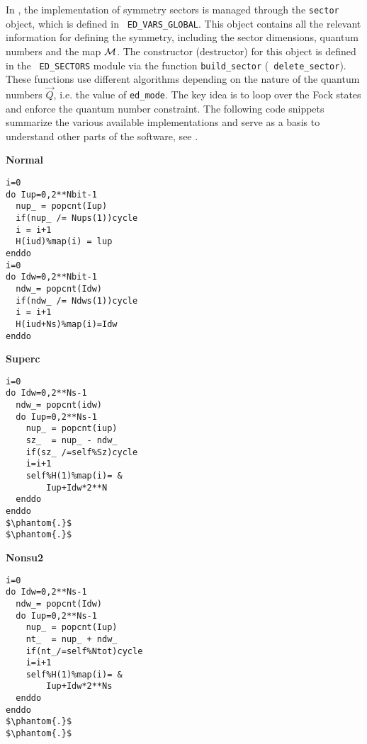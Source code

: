 \documentclass[edipack_sp.tex]{subfiles}
\begin{document}
In \NAME, the implementation of symmetry sectors is managed through the
{\tt sector} object, which is defined in {\tt
  ED\_VARS\_GLOBAL}. This object contains all the relevant
information for defining the symmetry, including the sector
dimensions, quantum numbers and the map ${\cal M}$. The constructor
(destructor) for this object is defined in the {\tt
  ED\_SECTORS} module via the function {\tt build\_sector} ({\tt
  delete\_sector}).
These functions use different algorithms depending on the nature 
of the quantum numbers $\vec{Q}$, i.e. the value of {\tt ed\_mode}. The key idea is to loop over the Fock states and enforce the quantum number constraint.
The following code snippets summarize the various available implementations and serve as a basis to understand other parts of the software, see .  
\begin{center}
\begin{minipage}[t]{0.32\linewidth}
\textbf{Normal}
\begin{lstlisting}[style=fstyle,frame=leftline,numbers=none,basicstyle={\ttfamily\scriptsize}]
i=0
do Iup=0,2**Nbit-1     
  nup_ = popcnt(Iup) 
  if(nup_ /= Nups(1))cycle
  i = i+1
  H(iud)%map(i) = lup
enddo
i=0
do Idw=0,2**Nbit-1
  ndw_= popcnt(Idw)
  if(ndw_ /= Ndws(1))cycle
  i = i+1
  H(iud+Ns)%map(i)=Idw
enddo
\end{lstlisting}
\end{minipage}
%
\begin{minipage}[t]{0.32\linewidth}
\textbf{Superc}
\begin{lstlisting}[style=fstyle,frame=leftline,numbers=none,basicstyle={\ttfamily\scriptsize}]
i=0
do Idw=0,2**Ns-1
  ndw_= popcnt(idw)
  do Iup=0,2**Ns-1
    nup_ = popcnt(iup)
    sz_  = nup_ - ndw_
    if(sz_ /=self%Sz)cycle
    i=i+1
    self%H(1)%map(i)= &
        Iup+Idw*2**N
  enddo
enddo
$\phantom{.}$
$\phantom{.}$
\end{lstlisting}
\end{minipage}
%
\begin{minipage}[t]{0.32\linewidth}
\textbf{Nonsu2}
\begin{lstlisting}[style=fstyle,frame=leftline,numbers=none,basicstyle={\ttfamily\scriptsize}]
i=0
do Idw=0,2**Ns-1
  ndw_= popcnt(Idw)
  do Iup=0,2**Ns-1
    nup_ = popcnt(Iup)
    nt_  = nup_ + ndw_
    if(nt_/=self%Ntot)cycle
    i=i+1
    self%H(1)%map(i)= &
        Iup+Idw*2**Ns
  enddo
enddo
$\phantom{.}$
$\phantom{.}$
\end{lstlisting}
\end{minipage}
\end{center}
\end{document}
